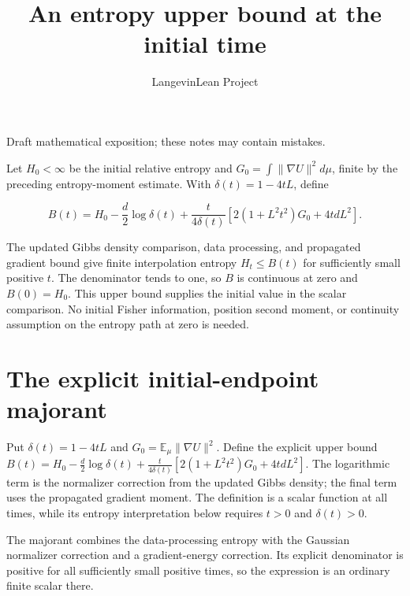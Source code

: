\documentclass[11pt,a4paper]{article}
\title{\texorpdfstring{An entropy upper bound at the initial time}{An entropy upper bound at the initial time}}
\author{LangevinLean Project}
\date{}
\begin{document}
\maketitle
Draft mathematical exposition; these notes may contain mistakes.


Let \(H_0<\infty\) be the initial relative entropy and \(G_0=\int\|\nabla U\|^2d\mu\), finite by the preceding entropy-moment estimate. With \(\delta(t)=1-4tL\), define

\[B(t)=H_0-\frac d2\log\delta(t)+\frac{t}{4\delta(t)}\left[2(1+L^2t^2)G_0+4tdL^2\right].\]

The updated Gibbs density comparison, data processing, and propagated gradient bound give finite interpolation entropy \(H_t\le B(t)\) for sufficiently small positive \(t\). The denominator tends to one, so \(B\) is continuous at zero and \(B(0)=H_0\). This upper bound supplies the initial value in the scalar comparison. No initial Fisher information, position second moment, or continuity assumption on the entropy path at zero is needed.


\section{\texorpdfstring{The explicit initial-endpoint majorant}{The explicit initial-endpoint majorant}}


Put \(\delta(t)=1-4tL\) and \(G_0=\mathbb E_\mu\|\nabla U\|^2\). Define the explicit upper bound \(B(t)=H_0-\frac d2\log\delta(t)+\frac{t}{4\delta(t)}[2(1+L^2t^2)G_0+4tdL^2]\). The logarithmic term is the normalizer correction from the updated Gibbs density; the final term uses the propagated gradient moment. The definition is a scalar function at all times, while its entropy interpretation below requires \(t>0\) and \(\delta(t)>0\).



The majorant combines the data-processing entropy with the Gaussian normalizer correction and a gradient-energy correction. Its explicit denominator is positive for all sufficiently small positive times, so the expression is an ordinary finite scalar there.
\end{document}
